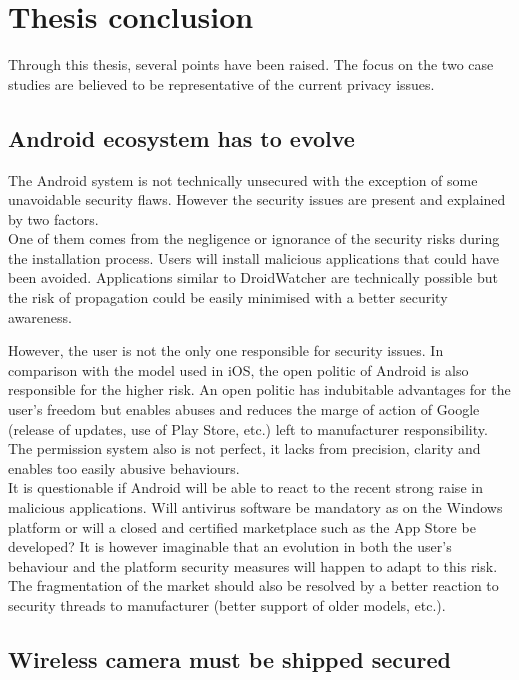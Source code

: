 \chapter{Thesis conclusion}
\label{chap:thesis-ccl}


Through this thesis, several points have been raised.
The focus on the two case studies are believed to be representative of the current privacy issues.

\section{Android ecosystem has to evolve}

The Android system is not technically unsecured with the exception of some unavoidable security flaws.
However the security issues are present and explained by two factors.\\

One of them comes from the negligence or ignorance of the security risks during the installation process.
Users will install malicious applications that could have been avoided.
Applications similar to DroidWatcher are technically possible but the risk of propagation could be easily minimised with a better security awareness.

However, the user is not the only one responsible for security issues.
In comparison with the model used in iOS, the open politic of Android is also responsible for the higher risk.
An open politic has indubitable advantages for the user's freedom but enables abuses and reduces the marge of action of Google (release of updates, use of Play Store, etc.) left to manufacturer responsibility.
The permission system also is not perfect, it lacks from precision, clarity and enables too easily abusive behaviours.\\

It is questionable if Android will be able to react to the recent strong raise in malicious applications.
Will antivirus software be mandatory as on the Windows platform or will a closed and certified marketplace such as the App Store be developed?
It is however imaginable that an evolution in both the user's behaviour and the platform security measures will happen to adapt to this risk.
The fragmentation of the market should also be resolved by a better reaction to security threads to manufacturer (better support of older models, etc.).

\section{Wireless camera must be shipped secured}


